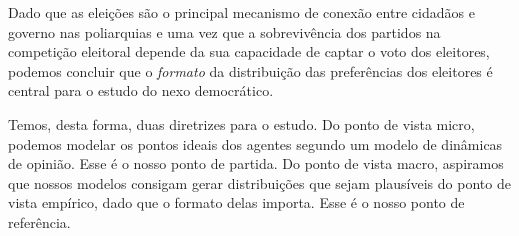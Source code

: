 Dado que as eleições são o principal mecanismo de conexão entre cidadãos e
governo nas poliarquias \cite{dahl1989democracy} e uma vez que a sobrevivência
dos partidos na competição eleitoral depende da sua capacidade de captar o voto
dos eleitores, podemos concluir que o \textit{formato} da distribuição das
preferências dos eleitores é central para o estudo do nexo democrático.

Temos, desta forma, duas diretrizes para o estudo. Do ponto de vista micro,
podemos modelar os pontos ideais dos agentes segundo um modelo de dinâmicas de
opinião. Esse é o nosso ponto de partida. Do ponto de vista macro, aspiramos que
nossos modelos consigam gerar distribuições que sejam plausíveis do ponto de
vista empírico, dado que o formato delas importa. Esse é o nosso ponto de
referência.





